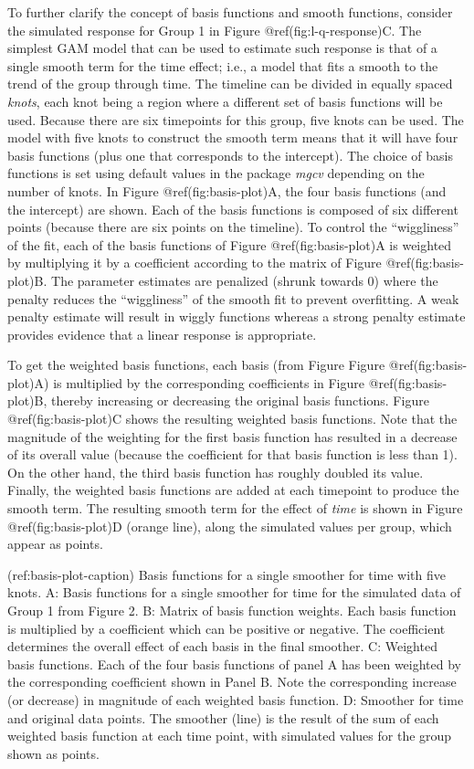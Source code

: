 \documentclass[Royal,times,sagev]{sagej}
\begin{document}
To further clarify the concept of basis functions and smooth functions,
consider the simulated response for Group 1 in Figure
@ref(fig:l-q-response)C. The simplest GAM model that can be used to
estimate such response is that of a single smooth term for the time
effect; i.e., a model that fits a smooth to the trend of the group
through time. The timeline can be divided in equally spaced
\emph{knots}, each knot being a region where a different set of basis
functions will be used. Because there are six timepoints for this group,
five knots can be used. The model with five knots to construct the
smooth term means that it will have four basis functions (plus one that
corresponds to the intercept). The choice of basis functions is set
using default values in the package \emph{mgcv} depending on the number
of knots. In Figure @ref(fig:basis-plot)A, the four basis functions (and
the intercept) are shown. Each of the basis functions is composed of six
different points (because there are six points on the timeline). To
control the ``wiggliness'' of the fit, each of the basis functions of
Figure @ref(fig:basis-plot)A is weighted by multiplying it by a
coefficient according to the matrix of Figure @ref(fig:basis-plot)B. The
parameter estimates are penalized (shrunk towards 0) where the penalty
reduces the ``wiggliness'' of the smooth fit to prevent overfitting. A
weak penalty estimate will result in wiggly functions whereas a strong
penalty estimate provides evidence that a linear response is
appropriate.

To get the weighted basis functions, each basis (from Figure Figure
@ref(fig:basis-plot)A) is multiplied by the corresponding coefficients
in Figure @ref(fig:basis-plot)B, thereby increasing or decreasing the
original basis functions. Figure @ref(fig:basis-plot)C shows the
resulting weighted basis functions. Note that the magnitude of the
weighting for the first basis function has resulted in a decrease of its
overall value (because the coefficient for that basis function is less
than 1). On the other hand, the third basis function has roughly doubled
its value. Finally, the weighted basis functions are added at each
timepoint to produce the smooth term. The resulting smooth term for the
effect of \emph{time} is shown in Figure @ref(fig:basis-plot)D (orange
line), along the simulated values per group, which appear as points.

(ref:basis-plot-caption) Basis functions for a single smoother for time
with five knots. A: Basis functions for a single smoother for time for
the simulated data of Group 1 from Figure 2. B: Matrix of basis function
weights. Each basis function is multiplied by a coefficient which can be
positive or negative. The coefficient determines the overall effect of
each basis in the final smoother. C: Weighted basis functions. Each of
the four basis functions of panel A has been weighted by the
corresponding coefficient shown in Panel B. Note the corresponding
increase (or decrease) in magnitude of each weighted basis function. D:
Smoother for time and original data points. The smoother (line) is the
result of the sum of each weighted basis function at each time point,
with simulated values for the group shown as points.
\end{document}

